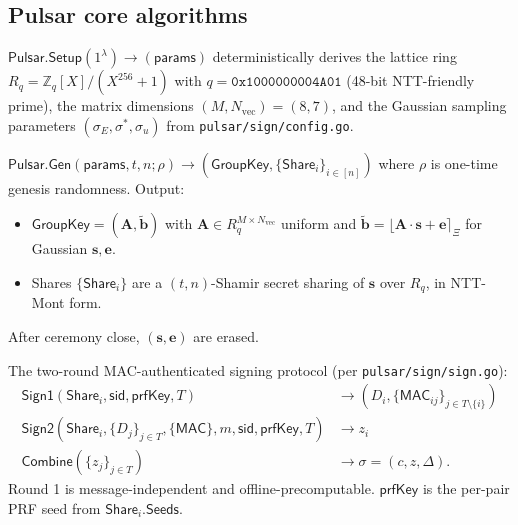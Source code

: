 
\subsection*{Pulsar core algorithms}

\begin{definition}
\label{def:pulsar-setup}
$\mathsf{Pulsar.Setup}(1^\lambda) \to (\mathsf{params})$ deterministically
derives the lattice ring $R_q = \mathbb{Z}_q[X]/(X^{256}+1)$ with
$q = \texttt{0x1000000004A01}$ (48-bit NTT-friendly prime), the matrix
dimensions $(M, N_{\textrm{vec}}) = (8, 7)$, and the Gaussian sampling
parameters $(\sigma_E, \sigma^*, \sigma_u)$ from \texttt{pulsar/sign/config.go}.
\end{definition}

\begin{definition}
\label{def:pulsar-gen}
$\mathsf{Pulsar.Gen}(\mathsf{params}, t, n; \rho) \to
(\mathsf{GroupKey}, \{\mathsf{Share}_i\}_{i \in [n]})$
where $\rho$ is one-time genesis randomness. Output:
\begin{itemize}[nosep]
  \item $\mathsf{GroupKey} = (\mathbf{A}, \tilde{\mathbf{b}})$ with
        $\mathbf{A} \in R_q^{M \times N_{\textrm{vec}}}$ uniform and
        $\tilde{\mathbf{b}} = \lfloor \mathbf{A}\cdot\mathbf{s} +
        \mathbf{e} \rceil_\Xi$ for Gaussian $\mathbf{s}, \mathbf{e}$.
  \item Shares $\{\mathsf{Share}_i\}$ are a $(t, n)$-Shamir secret sharing
        of $\mathbf{s}$ over $R_q$, in NTT-Mont form.
\end{itemize}
After ceremony close, $(\mathbf{s}, \mathbf{e})$ are erased.
\end{definition}

\begin{definition}
\label{def:pulsar-sign}
The two-round MAC-authenticated signing protocol (per
\texttt{pulsar/sign/sign.go}):
\begin{align*}
\mathsf{Sign1}(\mathsf{Share}_i, \mathsf{sid}, \mathsf{prfKey}, T)
  &\to (D_i, \{\mathsf{MAC}_{ij}\}_{j \in T \setminus \{i\}}) \\
\mathsf{Sign2}(\mathsf{Share}_i, \{D_j\}_{j \in T}, \{\mathsf{MAC}\},
  m, \mathsf{sid}, \mathsf{prfKey}, T) &\to z_i \\
\mathsf{Combine}(\{z_j\}_{j \in T}) &\to \sigma = (c, z, \Delta).
\end{align*}
Round 1 is message-independent and offline-pre\-com\-pu\-tab\-le.
$\mathsf{prfKey}$ is the per-pair PRF seed from $\mathsf{Share}_i.\mathsf{Seeds}$.
\end{definition}

